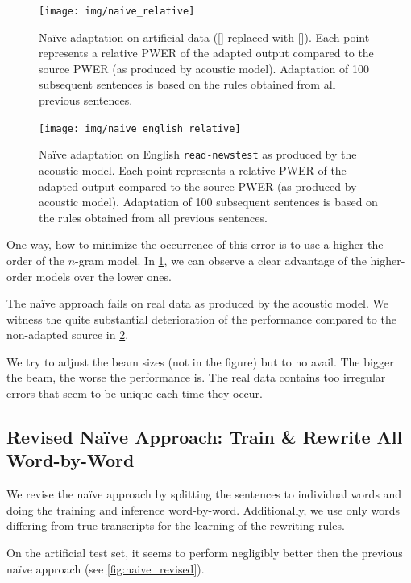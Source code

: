 \begin{figure}[h]
    \texttt{[image: img/naive\_relative]}
    \caption[Na\"ive adaptation on artificial data ]{Na\"ive adaptation on artificial data ([] replaced with []). Each point represents a relative PWER of the adapted output compared to the source PWER (as produced by acoustic model). Adaptation of 100 subsequent sentences is based on the rules obtained from all previous sentences.}
    \label{fig:naive} 
\end{figure}

\begin{figure}[h]
    \texttt{[image: img/naive\_english\_relative]}
    \caption[Na\"ive adaptation on English]{Na\"ive adaptation on English \texttt{read-newstest} as produced by the acoustic model. Each point represents a relative PWER of the adapted output compared to the source PWER (as produced by acoustic model). Adaptation of 100 subsequent sentences is based on the rules obtained from all previous sentences.}
    \label{fig:naive_en} 
\end{figure}

One way, how to minimize the occurrence of this error is to use a higher the order of the $n$-gram model. In \cref{fig:naive}, we can observe a clear advantage of the higher-order models over the lower ones.

The na\"ive approach fails on real data as produced by the acoustic model. We witness the quite substantial deterioration of the performance compared to the non-adapted source in \cref{fig:naive_en}. 

We try to adjust the beam sizes (not in the figure) but to no avail. The bigger the beam, the worse the performance is. The real data contains too irregular errors that seem to be unique each time they occur.

\subsection[Revised Na\"ive Approach: Train \& Rewrite All Word-by-Word]{Revised Na\"ive Approach: Train \& Rewrite All \\Word-by-Word}
We revise the na\"ive approach by splitting the sentences to individual words and doing the training and inference word-by-word. Additionally, we use only words differing from true transcripts for the learning of the rewriting rules. 

On the artificial test set, it seems to perform negligibly better then the previous na\"ive approach (see \cref{fig:naive_revised}).

